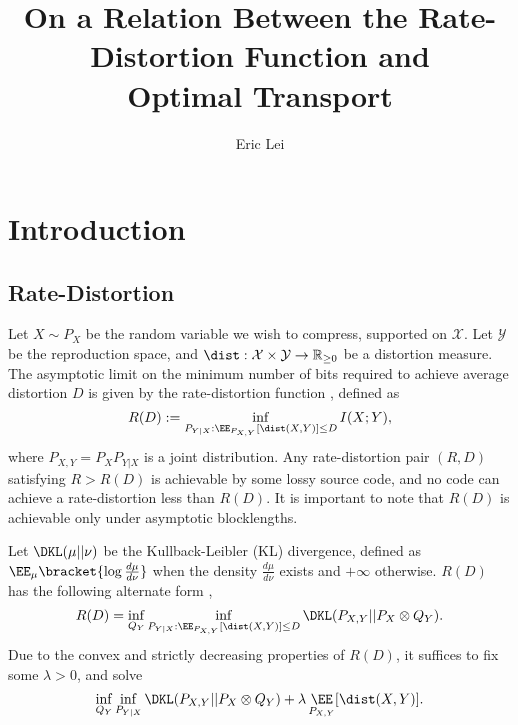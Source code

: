 \documentclass[11pt]{article}
\title{On a Relation Between the Rate-Distortion Function and \\Optimal Transport}
\author{Eric Lei}
\begin{document}
    \maketitle

    \section{Introduction}
    \subsection{Rate-Distortion}

    Let $X \sim P_X$ be the random variable we wish to compress, supported on $\mathcal{X}$. Let $\mathcal{Y}$ be the reproduction space, and $\dist: \mathcal{X} \times \mathcal{Y} \rightarrow \mathbb{R}_{\geq 0}$ be a distortion measure. The asymptotic limit on the minimum number of bits required to achieve average distortion $D$ is given by the rate-distortion function \cite{shannonRD, CoverThomas},  defined as
        \begin{equation}
    	    R(D) := \inf_{\substack{P_{Y|X}:  \EE_{P_{X,Y}}[\dist(X,Y)]  \leq D}} I(X;Y), 
    	    \label{eq:RD}
    	\end{equation} 
    where $P_{X,Y}=P_X P_{Y|X}$ is a joint distribution. Any rate-distortion pair $(R,D)$ satisfying $R > R(D)$ is achievable by some lossy source code, and no code can achieve a rate-distortion less than $R(D)$. It is important to note that $R(D)$ is achievable only under asymptotic blocklengths.
    

    Let $\DKL(\mu || \nu)$ be the Kullback-Leibler (KL) divergence, defined as $\EE_\mu\bracket{\log \frac{d\mu}{d\nu}}$ when the density $\frac{d\mu}{d\nu}$ exists and $+\infty$ otherwise. $R(D)$ has the following alternate form \cite[Ch.~10]{CoverThomas},
    \begin{equation}
    R(D) = \inf_{Q_Y} \inf_{\substack{P_{Y|X}:  \EE_{P_{X,Y}}[\dist(X,Y)]  \leq D}} \DKL(P_{X,Y}||P_X \otimes Q_Y).
    \label{eq:RD_alt}
    \end{equation}
    Due to the convex and strictly decreasing properties \cite{CoverThomas} of $R(D)$, it suffices to fix some $\lambda > 0$, and solve 
    \begin{equation}
        \inf_{Q_Y} \inf_{P_{Y|X}}\DKL(P_{X,Y}|| P_X \otimes Q_Y) + \lambda \mathop{\EE}_{P_{X,Y}}[\dist(X,Y)].
        \label{eq:RD_alt_regl}
    \end{equation}
\end{document}
